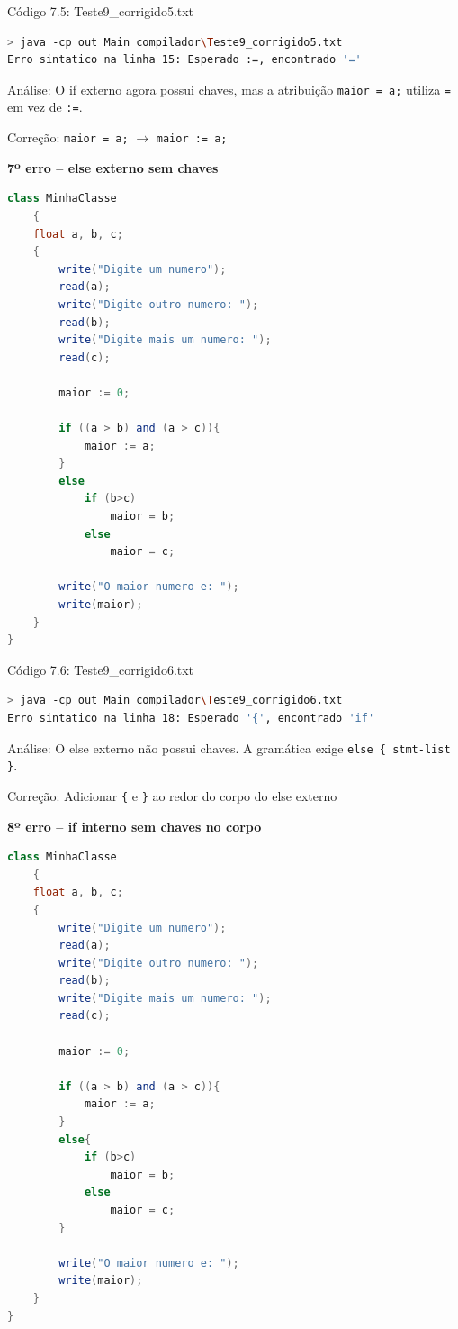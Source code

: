 \documentclass[12pt,a4paper]{article}
\begin{document}
Código 7.5: Teste9\_corrigido5.txt

\begin{lstlisting}[language=bash]
> java -cp out Main compilador\Teste9_corrigido5.txt
Erro sintatico na linha 15: Esperado :=, encontrado '='
\end{lstlisting}


Análise: O if externo agora possui chaves, mas a atribuição \texttt{maior = a;} utiliza \texttt{=} em vez de \texttt{:=}.

Correção: \texttt{maior = a;} $\to$ \texttt{maior := a;}

\textbf{7º erro -- else externo sem chaves}

\begin{lstlisting}[language=Java]
class MinhaClasse
    {
    float a, b, c;
    {
        write("Digite um numero");
        read(a);
        write("Digite outro numero: ");
        read(b);
        write("Digite mais um numero: ");
        read(c);

        maior := 0;

        if ((a > b) and (a > c)){
            maior := a;
        }
        else
            if (b>c)
                maior = b;
            else
                maior = c;

        write("O maior numero e: ");
        write(maior);
    }
}
\end{lstlisting}

Código 7.6: Teste9\_corrigido6.txt

\begin{lstlisting}[language=bash]
> java -cp out Main compilador\Teste9_corrigido6.txt
Erro sintatico na linha 18: Esperado '{', encontrado 'if'
\end{lstlisting}


Análise: O else externo n\~ao possui chaves. A gram\'atica exige \texttt{else \{ stmt-list \}}.

Corre\c{c}\~ao: Adicionar \texttt{\{} e \texttt{\}} ao redor do corpo do else externo

\textbf{8º erro -- if interno sem chaves no corpo}

\begin{lstlisting}[language=Java]
class MinhaClasse
    {
    float a, b, c;
    {
        write("Digite um numero");
        read(a);
        write("Digite outro numero: ");
        read(b);
        write("Digite mais um numero: ");
        read(c);

        maior := 0;

        if ((a > b) and (a > c)){
            maior := a;
        }
        else{
            if (b>c)
                maior = b;
            else
                maior = c;
        }

        write("O maior numero e: ");
        write(maior);
    }
}
\end{lstlisting}
\end{document}
